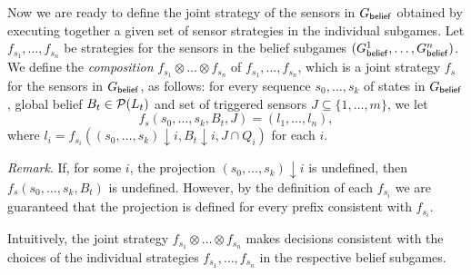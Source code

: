 Now we are ready to define the joint strategy of the sensors in $G_{\mathsf{belief}}$ obtained by executing together a given set of sensor strategies in the individual subgames. 
Let $f_{s_1},\ldots,f_{s_n}$ be strategies for the sensors in the belief subgames $(G^{1}_{\mathsf{belief}},\ldots,G^{n}_{\mathsf{belief}})$. We define the \emph{composition} $f_{s_1} \otimes\ldots\otimes f_{s_n}$ of $f_{s_1},\ldots,f_{s_n}$, which is a joint strategy $f_s$ for the sensors in $G_{\mathsf{belief}}$, as follows:
for every sequence $s_0,\ldots,s_k$ of states in $G_{\mathsf{belief}}$, global belief $B_t \in \mathcal{P}(L_t)$ and set of triggered sensors $J \subseteq \{1,\ldots,m\}$, we let
\[f_s(s_0,\ldots,s_k,B_t,J) = (l_1,\ldots,l_n),\]
where $l_i = f_{s_i}((s_0,\ldots,s_k){\downarrow}i,B_t{\downarrow}i, J \cap Q_i)$ for each $i$. 

\emph{Remark}. If, for some $i$, the projection $(s_0,\ldots,s_k){\downarrow}i$ is undefined, then $f_s(s_0,\ldots,s_k,B_t)$ is undefined. However, by the definition of each $f_{s_i}$ we are guaranteed that the projection is defined for every prefix consistent with $f_{s_i}$.

Intuitively, the joint strategy $f_{s_1} \otimes\ldots\otimes f_{s_n}$ makes decisions consistent with the choices of the individual strategies $f_{s_1}, \ldots, f_{s_n}$ in the respective belief subgames.


